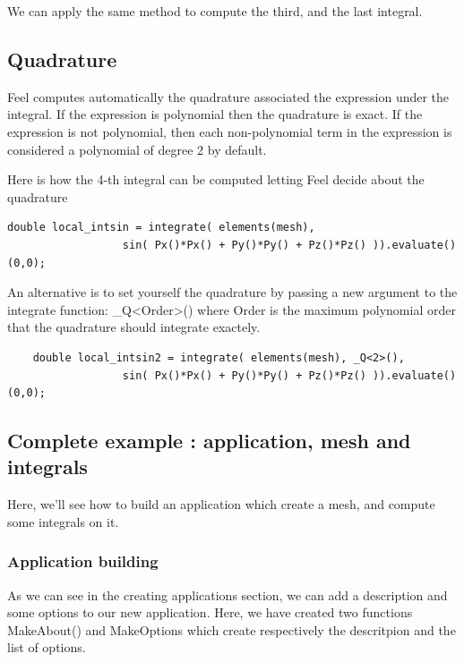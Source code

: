 We can apply the same method to compute the third, and the last integral. \\

\subsection{Quadrature}

Feel computes automatically the quadrature associated the expression under the integral. If the expression is polynomial then the quadrature is exact. If the expression is not polynomial, then each non-polynomial term in the expression is considered a polynomial of degree 2 by default.

Here is how the 4-th integral can be computed letting Feel decide about the quadrature \\
\begin{lstlisting}
double local_intsin = integrate( elements(mesh),
                  sin( Px()*Px() + Py()*Py() + Pz()*Pz() )).evaluate()(0,0);
\end{lstlisting}
\vspace{0.2cm}

An alternative is to set yourself the quadrature by passing a new argument to the integrate function: \_Q<Order>() where Order is the maximum polynomial order that the quadrature should integrate exactely.
\begin{lstlisting}
    double local_intsin2 = integrate( elements(mesh), _Q<2>(),
                  sin( Px()*Px() + Py()*Py() + Pz()*Pz() )).evaluate()(0,0);
\end{lstlisting}

\subsection{Complete example : application, mesh and integrals}

Here, we'll see how to build an application which create a mesh, and compute some integrals on it.

\subsubsection{Application building}
As we can see in the creating applications section, we can add a description and some options to our new application.
Here, we have created two functions MakeAbout() and MakeOptions which create respectively the descritpion and the list of options.
\\

